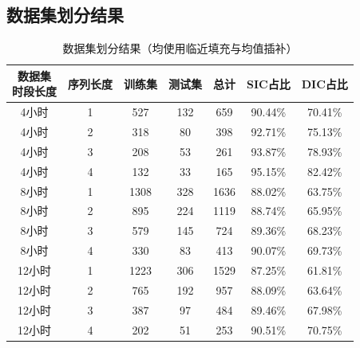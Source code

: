 \documentclass[12pt, a4paper, oneside]{ctexart}
\numberwithin{equation}{section}  %
\begin{document}
\subsection{数据集划分结果}
\renewcommand\arraystretch{1.2} %
\begin{table}[H] %
    \centering %
\begin{tabular}{ccccccc}
        \toprule
\makecell{\textbf{数据集}\\\textbf{时段长度}} & \textbf{序列长度} & \textbf{训练集} & \textbf{测试集} & \textbf{总计} & \textbf{SIC占比} & \textbf{DIC占比} \\
        \midrule
4小时& 1               & 527          & 132          & 659         & 90.44\%        & 70.41\%        \\
4小时& 2               & 318          & 80           & 398         & 92.71\%        & 75.13\%        \\
4小时  & 3               & 208          & 53           & 261         & 93.87\%        & 78.93\%        \\
4小时  & 4               & 132          & 33           & 165         & 95.15\%        & 82.42\%        \\
8小时  & 1               & 1308         & 328          & 1636        & 88.02\%        & 63.75\%        \\
8小时  & 2               & 895          & 224          & 1119        & 88.74\%        & 65.95\%        \\
8小时  & 3               & 579          & 145          & 724         & 89.36\%        & 68.23\%        \\
8小时  & 4               & 330          & 83           & 413         & 90.07\%        & 69.73\%        \\
12小时 & 1               & 1223         & 306          & 1529        & 87.25\%        & 61.81\%        \\
12小时 & 2               & 765          & 192          & 957         & 88.09\%        & 63.64\%        \\
12小时 & 3               & 387          & 97           & 484         & 89.46\%        & 67.98\%        \\
12小时 & 4               & 202          & 51           & 253         & 90.51\%        & 70.75\%       \\
        \bottomrule
\end{tabular}
    \caption{数据集划分结果（均使用临近填充与均值插补）}
    \label{table-divide}
\end{table}
\clearpage
\end{document}
